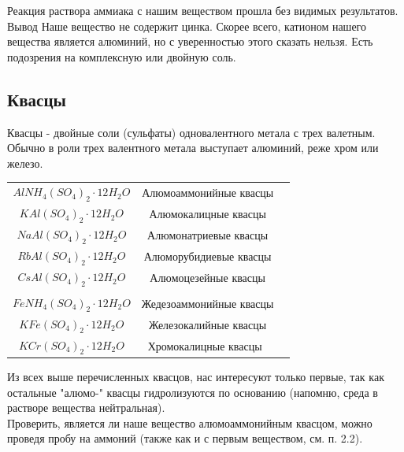 \documentclass[a4paper,14pt,titlepage,twoside]{article}
\begin{document}
            Реакция раствора аммиака с нашим веществом прошла без видимых 
            результатов.\\
    
            Вывод\newline
            Наше вещество не содержит цинка. Скорее всего, катионом 
            нашего вещества является алюминий, но с уверенностью этого сказать нельзя.
            Есть подозрения на комплексную или двойную соль.

        \newpage
        \subsection{Квасцы}
            Квасцы - двойные соли (сульфаты) одновалентного метала с трех валетным.
            Обычно в роли трех валентного метала выступает алюминий, реже хром или железо.\\
                
            \begin{center}
                \begin{tabular}{ccc}
                    $AlNH_4(SO_4)_2 \cdot 12H_2O$ & Алюмоаммонийные квасцы\\
                    $KAl(SO_4)_2 \cdot 12H_2O$ & Алюмокалицные квасцы\\
                    $NaAl(SO_4)_2 \cdot 12H_2O$ & Алюмонатриевые квасцы\\
                    $RbAl(SO_4)_2 \cdot 12H_2O$ & Алюморубидиевые квасцы\\
                    $CsAl(SO_4)_2 \cdot 12H_2O$ & Алюмоцезейные квасцы\\\\
                    $FeNH_4(SO_4)_2 \cdot 12H_2O$ & Жедезоаммонийные квасцы\\
                    $KFe(SO_4)_2 \cdot 12H_2O$ & Железокалийные квасцы\\
                    $KCr(SO_4)_2 \cdot 12H_2O$ & Хромокалицные квасцы\
                \end{tabular}   
                \end{center}

            Из всех выше перечисленных квасцов, нас интересуют только первые,
            так как остальные "алюмо-" {}квасцы гидролизуются по основанию 
            (напомню, среда в растворе вещества нейтральная).\\

            Проверить, является ли наше вещество алюмоаммонийным квасцом, можно
            проведя пробу на аммоний (также как и с первым веществом, см. п. 2.2).\\
            
\end{document}
